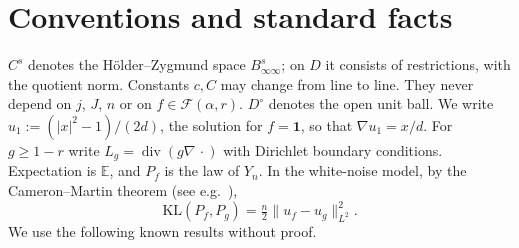 \documentclass[11pt]{article}
\theoremstyle{definition}
\theoremstyle{remark}
\newcommand{\E}{\mathbb E}
\newcommand{\one}{\mathbf 1}
\newcommand{\Fc}{\mathcal F}
\newcommand{\dv}{\operatorname{div}}
\newcommand{\KL}{\mathrm{KL}}
\newcommand{\Dint}{D^{\circ}}
\begin{document}
\section{Conventions and standard facts}\label{sec:facts}

$C^s$ denotes the H\"older--Zygmund space $B^s_{\infty\infty}$; on $D$ it consists of restrictions, with the quotient norm. Constants $c,C$ may change from line to line. They never depend on $j$, $J$, $n$ or on $f\in\Fc(\alpha,r)$. $\Dint$ denotes the open unit ball. We write $u_1:=(|x|^2-1)/(2d)$, the solution for $f=\one$, so that $\nabla u_1=x/d$. For $g\ge 1-r$ write $L_g=\dv(g\nabla\,\cdot)$ with Dirichlet boundary conditions. Expectation is $\E$, and $P_f$ is the law of $Y_n$. In the white-noise model, by the Cameron--Martin theorem (see e.g.\ \cite{GN16}),
\[
\KL(P_f,P_g)=\tfrac n2\|u_f-u_g\|_{L^2}^2 .
\]
We use the following known results without proof.

\end{document}

